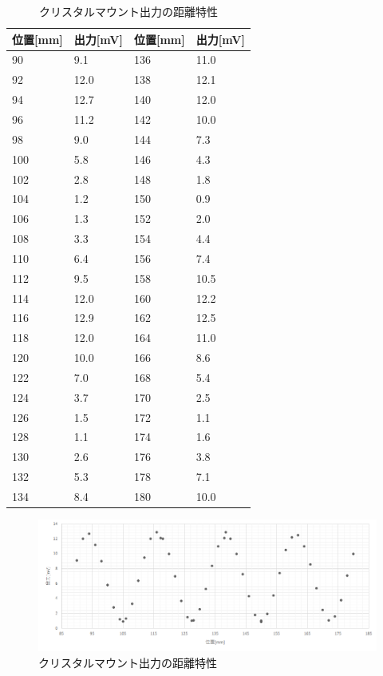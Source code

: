 \newpage
\begin{table}[]
  \centering
  \caption{クリスタルマウント出力の距離特性}
  \begin{tabular}{|l|l||l|l|}
  \hline
  位置{[}mm{]} & 出力{[}mV{]} & 位置{[}mm{]} & 出力{[}mV{]} \\ \hline
  90& 9.1& 136& 11.0\\ \hline
  92& 12.0& 138& 12.1\\ \hline
  94& 12.7& 140& 12.0\\ \hline
  96& 11.2& 142& 10.0\\ \hline
  98& 9.0& 144& 7.3\\ \hline
  100& 5.8& 146& 4.3\\ \hline
  102& 2.8& 148& 1.8\\ \hline
  104& 1.2& 150& 0.9\\ \hline
  106& 1.3& 152& 2.0\\ \hline
  108& 3.3& 154& 4.4\\ \hline
  110& 6.4& 156& 7.4\\ \hline
  112& 9.5& 158& 10.5\\ \hline
  114& 12.0& 160& 12.2\\ \hline
  116& 12.9& 162& 12.5\\ \hline
  118& 12.0& 164& 11.0\\ \hline
  120& 10.0& 166& 8.6\\ \hline
  122& 7.0& 168& 5.4\\ \hline
  124& 3.7& 170& 2.5\\ \hline
  126& 1.5& 172& 1.1\\ \hline
  128& 1.1& 174& 1.6\\ \hline
  130& 2.6& 176& 3.8\\ \hline
  132& 5.3& 178& 7.1\\ \hline
  134& 8.4& 180& 10.0\\ \hline
  \end{tabular}
\end{table}

\newpage
\begin{landscape}
  \begin{figure}
    \centering
    \includegraphics[width=25cm]{./data/data.png}
    \caption{クリスタルマウント出力の距離特性}
  \end{figure}
\end{landscape}


